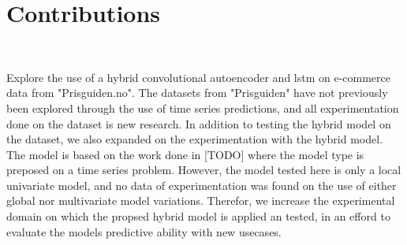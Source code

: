 
\section{Contributions}~\label{cont}
\label{section:Discussion:Contributions}

Explore the use of a hybrid convolutional autoencoder and lstm on e-commerce data from "Prisguiden.no".
The datasets from "Prisguiden" have not previously been explored through the use of time series predictions,
and all experimentation done on the dataset is new research.
In addition to testing the hybrid model on the dataset,
we also expanded on the experimentation with the hybrid model.
The model is based on the work done in [TODO] where the model type is preposed on a time series problem.
However, the model tested here is only a local univariate model, and no data of experimentation was found
on the use of either global nor multivariate model variations.
Therefor, we increase the experimental domain on which the propsed hybrid model is applied an tested,
in an efford to evaluate the models predictive ability with new usecases.

